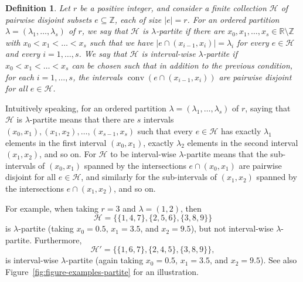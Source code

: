 \documentclass{aic}
\newtheorem{definition}[theorem]{Definition}
\theoremstyle{definition}
\numberwithin{equation}{section}
\numberwithin{figure}{section}
\newcommand{\su}{\subseteq}
\newcommand{\Z}{\mathbb{Z}}
\newcommand{\HH}{\mathcal{H}}
\newcommand{\conv}{\operatorname{conv}}
\begin{document}
\begin{definition}\label{def-s-partite}
    Let $r$ be a positive integer, and consider a finite collection $\HH$ of pairwise disjoint subsets $e\su \Z$, each of size $|e|=r$. For an ordered partition $\lambda=(\lambda_1,\dots,\lambda_s)$ of $r$, we say that $\HH$ is \emph{$\lambda$-partite} if there are $x_0,x_1,\dots,x_{s}\in\mathbb{R}\setminus\Z$ with $x_0<x_1<\dots<x_{s}$ such that we have $|e\cap (x_{i-1},x_i)|=\lambda_i$ for every $e\in \HH$ and every $i=1,\dots,s$. We say that $\HH$ is \emph{interval-wise $\lambda$-partite} if $x_0<x_1<\dots<x_{s}$ can be chosen such that in addition to the previous condition, for each $i=1,\dots,s$, the intervals $\conv(e\cap (x_{i-1},x_i))$  are pairwise disjoint for all $e\in \HH$.
\end{definition}

Intuitively speaking, for an ordered partition $\lambda=(\lambda_1,\dots,\lambda_s)$ of $r$, saying that $\HH$ is $\lambda$-partite means that there are $s$ intervals $(x_0,x_1),(x_1,x_2),\dots,(x_{s-1},x_s)$ such that every $e\in \HH$ has exactly $\lambda_1$ elements in the first interval $(x_0,x_1)$, exactly $\lambda_2$ elements in the second interval $(x_1,x_2)$, and so on. For $\HH$ to be interval-wise $\lambda$-partite means that the sub-intervals of $(x_0,x_1)$ spanned by the intersections $e\cap (x_0,x_1)$ are pairwise disjoint for all $e\in \HH$, and similarly for the sub-intervals of $(x_1,x_2)$ spanned by the intersections $e\cap (x_1,x_2)$, and so on.

For example, when taking $r=3$ and $\lambda=(1,2)$, then
\[
\HH = \{ \{1,4,7\}, \{2, 5,6\}, \{3,8,9\} \}
\]
is $\lambda$-partite (taking $x_0=0.5$, $x_1 = 3.5$, and $x_2 = 9.5$), but not interval-wise $\lambda$-partite. Furthermore,
\[
\mathcal H' = \{\{1,6,7\}, \{2, 4,5\}, \{3,8,9\}\},
\]
is interval-wise $\lambda$-partite (again taking $x_0=0.5$, $x_1 = 3.5$, and $x_2 = 9.5$). See also Figure~\ref{fig:figure-examples-partite} for an illustration.
\end{document}
